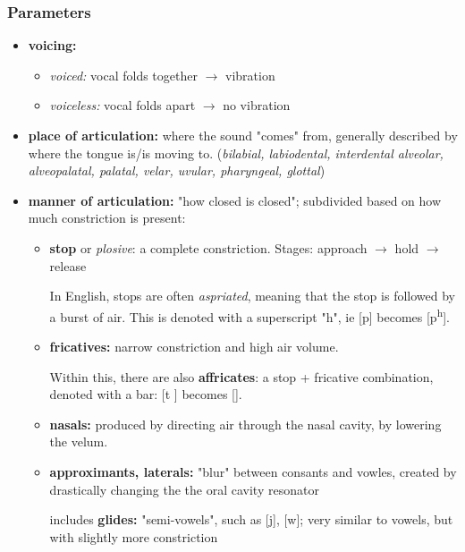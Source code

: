 \documentclass[12pt]{article}
\begin{document}
\subsubsection{Parameters}
\begin{itemize}
  \item \textbf{voicing:}\begin{itemize}
    \item \textit{voiced:} vocal folds together $\to$ vibration
    \item \textit{voiceless:} vocal folds apart $\to$ no vibration
  \end{itemize}
  \item \textbf{place of articulation:} where the sound "comes" from, generally described by where the tongue is/is moving to.
  (\textit{bilabial, labiodental, interdental alveolar, alveopalatal, palatal, velar, uvular, pharyngeal, glottal})
  \item \textbf{manner of articulation:} "how closed is closed"; subdivided based on how much constriction is present: \begin{itemize}
    \item \textbf{stop} or \textit{plosive}: a complete constriction. Stages: approach $\to$ hold $\to$ release
    
    In English, stops are often \textit{aspriated}, meaning that the stop is followed by a burst of air. This is denoted with a superscript "h", ie [p] becomes [p\textsuperscript{h}].

    \item \textbf{fricatives:} narrow constriction and high air volume. 
    
    Within this, there are also \textbf{affricates}: a stop + fricative combination, denoted with a bar: [t ] becomes [].

    \item \textbf{nasals:} produced by directing air through the nasal cavity, by lowering the velum.
    \item \textbf{approximants, laterals:} "blur" between consants and vowles, created by drastically changing the the oral cavity resonator
    
    includes \textbf{glides:} "semi-vowels", such as [j], [w]; very similar to vowels, but with slightly more constriction
  \end{itemize}
\end{itemize}
\end{document}
